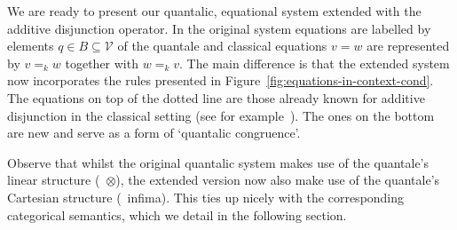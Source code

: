 \documentclass[a4paper,UKenglish,cleveref, autoref, thm-restate]{lipics-v2021}
\begin{document}
We are ready to present our quantalic, equational system extended with the
additive disjunction operator.  In the original system equations are labelled
by elements $q \in B \subseteq \mathcal{V}$ of the quantale and classical
equations $v = w$ are represented by $v =_k w$ together with $w =_k v$. The
main difference is that the extended system now incorporates the rules
presented in Figure~\ref{fig:equations-in-context-cond}. The equations on top
of the dotted line are those already known for additive disjunction in the
classical setting (see for example~\cite{croleCategoriesTypes1994}). The ones
on the bottom are new and serve as a form of `quantalic congruence'. 

Observe that whilst the original quantalic system makes use of the quantale's
linear structure (\ie\ $\otimes$), the extended version now also make use of
the quantale's Cartesian structure (\ie\ infima). This ties up nicely with the
corresponding categorical semantics, which we detail in the following section.
\end{document}
